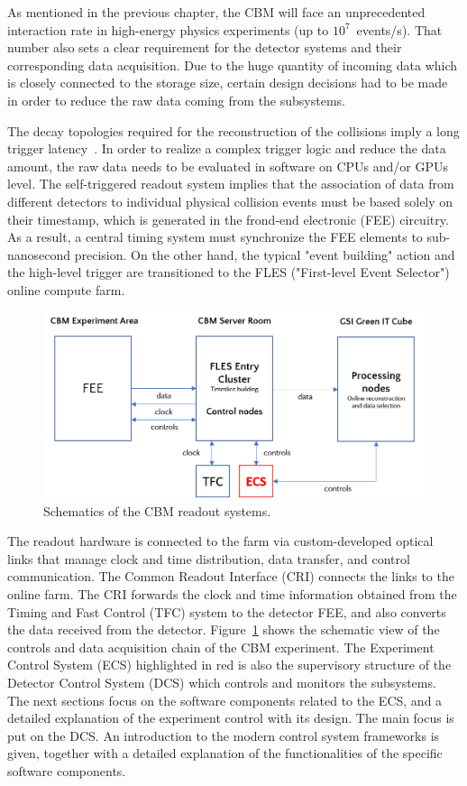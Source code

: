 
As mentioned in the previous chapter, the \gls{CBM} will face an unprecedented interaction rate in high-energy physics experiments (up to $10^{7}$~events/s). That number also sets a clear requirement for the detector systems and their corresponding data acquisition. Due to the huge quantity of incoming data which is closely connected to the storage size, certain design decisions had to be made in order to reduce the raw data coming from the subsystems. 

The decay topologies required for the reconstruction of the collisions imply a long trigger latency~\cite{Friese_2017}. In order to realize a complex trigger logic and reduce the data amount, the raw data needs to be evaluated in software on \glspl{CPU} and/or \glspl{GPU} level. The self-triggered readout system implies that the association of data from different detectors to individual physical collision events must be based solely on their timestamp, which is generated in the frond-end electronic (\gls{FEE}) circuitry. As a result, a central timing system must synchronize the \gls{FEE} elements to sub-nanosecond precision. On the other hand, the typical "event building" action and the high-level trigger are transitioned to the \gls{FLES} ("First-level Event Selector") online compute farm. 


\begin{figure}[!h]
\centering
\includegraphics[width=0.7\columnwidth]{Chapter3/Controls/images/online.png}
\caption{Schematics of the CBM readout systems.}
\label{fig_controls}
\end{figure}

\newpage
The readout hardware is connected to the farm via custom-developed optical links that manage clock and time distribution, data transfer, and control communication. The Common Readout Interface (\gls{CRI}) connects the links to the online farm. The \gls{CRI} forwards the clock and time information obtained from the Timing and Fast Control (\gls{TFC}) system to the detector \gls{FEE}, and also converts the data received from the detector. Figure~\ref{fig_controls} shows the schematic view of the controls and data acquisition chain of the \gls{CBM} experiment. The Experiment Control System (\gls{ECS}) highlighted in red is also the supervisory structure of the Detector Control System (\gls{DCS}) which controls and monitors the subsystems. The next sections focus on the software components related to the \gls{ECS}, and a detailed explanation of the experiment control with its design. The main focus is put on the \gls{DCS}. An introduction to the modern control system frameworks is given, together with a detailed explanation of the functionalities of the specific software components. 
